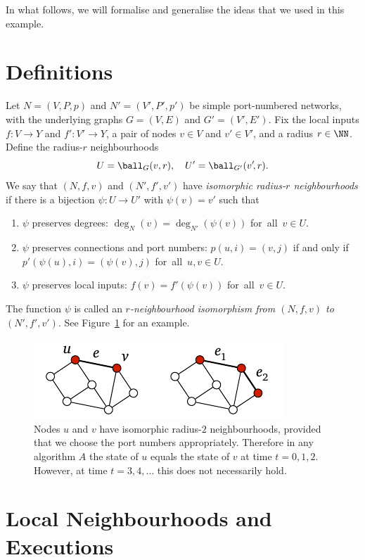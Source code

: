 In what follows, we will formalise and generalise the ideas that we used in this example.

\section{Definitions}

Let $N = (V,P,p)$ and $N' = (V'\!,P'\!,p')$ be simple port-numbered networks, with the underlying graphs $G = (V,E)$ and $G' = (V'\!,E')$. Fix the local inputs $f\colon V \to Y$ and $f'\colon V' \to Y$, a pair of nodes $v \in V$ and $v' \in V'$, and a radius $r \in \NN$. Define the radius-$r$ neighbourhoods
\[
    U = \ball_G(v,r), \quad U' = \ball_{G'}(v'\!,r).
\]
We say that $(N,f,v)$ and $(N'\!,f'\!,v')$ have \emph{isomorphic radius-$r$ neighbourhoods} if there is a bijection $\psi \colon U \to U'$ with $\psi(v) = v'$ such that
\begin{enumerate}\raggedright
    \item $\psi$ preserves degrees: $\deg_{N}(v) = \deg_{N'}(\psi(v))$ for~all~$v \in U$.
    \item $\psi$ preserves connections and port numbers: $p(u,i) = (v,j)$ if and only if $p'(\psi(u),i) = (\psi(v),j)$ for~all~$u, v \in U$.
    \item $\psi$ preserves local inputs: $f(v) = f'(\psi(v))$ for~all~$v \in U$.
\end{enumerate}
The function $\psi$ is called an \emph{$r$-neighbourhood isomorphism from $(N,f,v)$ to $(N'\!,f'\!,v')$}. See Figure~\ref{fig:same-neigh} for an example.

\begin{figure}
    \centering
    \includegraphics[page=\PSameNeigh]{figs.pdf}
    \caption{Nodes $u$ and $v$ have isomorphic radius-$2$ neighbourhoods, provided that we choose the port numbers appropriately. Therefore in any algorithm $A$ the state of $u$ equals the state of $v$ at time $t = 0,1,2$. However, at time $t = 3, 4, \dotsc$ this does not necessarily hold.}\label{fig:same-neigh}
\end{figure}

\section{Local Neighbourhoods and Executions}

